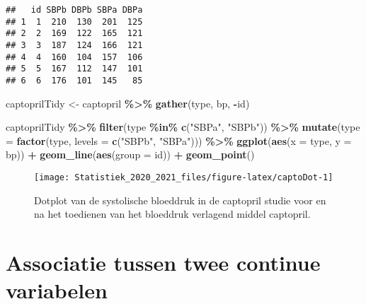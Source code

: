 \documentclass[
  12pt,dutch,coursenotes]{book}
\newenvironment{Shaded}{\begin{snugshade}}{\end{snugshade}}
\newcommand{\DataTypeTok}[1]{\textcolor[rgb]{0.13,0.29,0.53}{#1}}
\newcommand{\KeywordTok}[1]{\textcolor[rgb]{0.13,0.29,0.53}{\textbf{#1}}}
\newcommand{\NormalTok}[1]{#1}
\newcommand{\OperatorTok}[1]{\textcolor[rgb]{0.81,0.36,0.00}{\textbf{#1}}}
\newcommand{\StringTok}[1]{\textcolor[rgb]{0.31,0.60,0.02}{#1}}
\theoremstyle{definition}
\theoremstyle{definition}
\theoremstyle{definition}
\theoremstyle{remark}
\begin{document}
\begin{verbatim}
##   id SBPb DBPb SBPa DBPa
## 1  1  210  130  201  125
## 2  2  169  122  165  121
## 3  3  187  124  166  121
## 4  4  160  104  157  106
## 5  5  167  112  147  101
## 6  6  176  101  145   85
\end{verbatim}

\begin{Shaded}
\begin{Highlighting}[]
\NormalTok{captoprilTidy \textless{}{-}}\StringTok{ }\NormalTok{captopril }\OperatorTok{\%\textgreater{}\%}\StringTok{ }\KeywordTok{gather}\NormalTok{(type, bp, }\OperatorTok{{-}}\NormalTok{id)}

\NormalTok{captoprilTidy }\OperatorTok{\%\textgreater{}\%}\StringTok{ }\KeywordTok{filter}\NormalTok{(type }\OperatorTok{\%in\%}\StringTok{ }\KeywordTok{c}\NormalTok{(}\StringTok{"SBPa"}\NormalTok{, }\StringTok{"SBPb"}\NormalTok{)) }\OperatorTok{\%\textgreater{}\%}\StringTok{ }
\StringTok{    }\KeywordTok{mutate}\NormalTok{(}\DataTypeTok{type =} \KeywordTok{factor}\NormalTok{(type, }\DataTypeTok{levels =} \KeywordTok{c}\NormalTok{(}\StringTok{"SBPb"}\NormalTok{, }\StringTok{"SBPa"}\NormalTok{))) }\OperatorTok{\%\textgreater{}\%}\StringTok{ }
\StringTok{    }\KeywordTok{ggplot}\NormalTok{(}\KeywordTok{aes}\NormalTok{(}\DataTypeTok{x =}\NormalTok{ type, }\DataTypeTok{y =}\NormalTok{ bp)) }\OperatorTok{+}\StringTok{ }\KeywordTok{geom\_line}\NormalTok{(}\KeywordTok{aes}\NormalTok{(}\DataTypeTok{group =}\NormalTok{ id)) }\OperatorTok{+}\StringTok{ }
\StringTok{    }\KeywordTok{geom\_point}\NormalTok{()}
\end{Highlighting}
\end{Shaded}

\begin{figure}

{\centering \texttt{[image: Statistiek\_2020\_2021\_files/figure-latex/captoDot-1]} 

}

\caption{Dotplot van de systolische bloeddruk in de captopril studie voor en na het toedienen van het bloeddruk verlagend middel captopril.}\label{fig:captoDot}
\end{figure}

\hypertarget{associatie-tussen-twee-continue-variabelen}{%
\section{Associatie tussen twee continue variabelen}\label{associatie-tussen-twee-continue-variabelen}}
\end{document}
